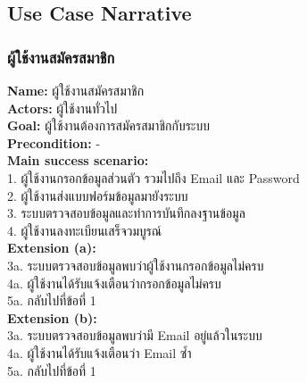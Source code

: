 \documentclass[12pt,oneside,openright,a4paper]{cpe-thai-project}
\begin{document}
\begin{itemize}
\subsection{Use Case Narrative}

\subsubsection{ผู้ใช้งานสมัครสมาชิก}
\textbf{Name: }ผู้ใช้งานสมัครสมาชิก \\
\textbf{Actors: }ผู้ใช้งานทั่วไป \\
\textbf{Goal: }ผู้ใช้งานต้องการสมัครสมาชิกกับระบบ \\
\textbf{Precondition: }- \\
\textbf{Main success scenario: } \\
  \hspace*{0.5cm}1. ผู้ใช้งานกรอกข้อมูลส่วนตัว รวมไปถึง Email และ Password \\
  \hspace*{0.5cm}2. ผู้ใช้งานส่งแบบฟอร์มข้อมูลมายังระบบ \\
  \hspace*{0.5cm}3. ระบบตรวจสอบข้อมูลและทำการบันทึกลงฐานข้อมูล \\
  \hspace*{0.5cm}4. ผู้ใช้งานลงทะเบียนเสร็จวมบูรณ์ \\
\textbf{Extension (a): } \\
  \hspace*{0.5cm}3a. ระบบตรวจสอบข้อมูลพบว่าผู้ใช้งานกรอกข้อมูลไม่ครบ \\
  \hspace*{0.5cm}4a. ผู้ใช้งานได้รับแจ้งเตือนว่ากรอกข้อมูลไม่ครบ \\
  \hspace*{0.5cm}5a. กลับไปที่ข้อที่ 1 \\
\textbf{Extension (b): }  \\
  \hspace*{0.5cm}3a. ระบบตรวจสอบข้อมูลพบว่ามี Email อยู่แล้วในระบบ \\
  \hspace*{0.5cm}4a. ผู้ใช้งานได้รับแจ้งเตือนว่า Email ซ้ำ \\
  \hspace*{0.5cm}5a. กลับไปที่ข้อที่ 1 
\begin{figure}[!ht]\centering

\end{figure}
\end{itemize}
\end{document}
